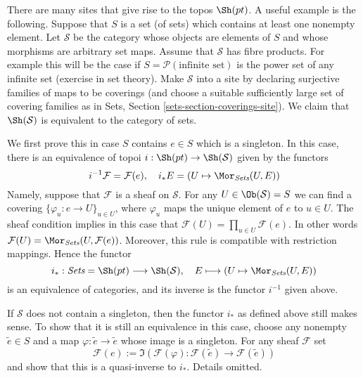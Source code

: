 \begin{remark}
\label{remark-pt-topos}
There are many sites that give rise to the topos $\Sh(pt)$.
A useful example is the following. Suppose that $S$ is a set (of sets)
which contains at least one nonempty element. Let $\mathcal{S}$ be the
category whose objects are elements of $S$ and whose morphisms are
arbitrary set maps. Assume that $\mathcal{S}$ has fibre products.
For example this will be the case if $S = \mathcal{P}(\text{infinite set})$
is the power set of any infinite set (exercise in set theory).
Make $\mathcal{S}$ into a site by declaring
surjective families of maps to be coverings (and choose
a suitable sufficiently large set of covering families as in
Sets, Section \ref{sets-section-coverings-site}).
We claim that $\Sh(\mathcal{S})$ is equivalent to the category of
sets.

\medskip\noindent
We first prove this in case $S$ contains $e \in S$ which is a singleton.
In this case, there is an equivalence of topoi
$i : \Sh(pt) \to \Sh(\mathcal{S})$ given by
the functors
\begin{equation}
\label{equation-sheaves-pt-sets}
i^{-1}\mathcal{F} = \mathcal{F}(e), \quad
i_*E = (U \mapsto \Mor_{\textit{Sets}}(U, E))
\end{equation}
Namely, suppose that $\mathcal{F}$ is a sheaf on $\mathcal{S}$.
For any $U \in \Ob(\mathcal{S}) = S$ we can find a covering
$\{\varphi_u : e \to U\}_{u \in U}$, where $\varphi_u$
maps the unique element of $e$ to $u \in U$. The sheaf condition
implies in this case that
$\mathcal{F}(U) = \prod_{u \in U} \mathcal{F}(e)$.
In other words
$\mathcal{F}(U) = \Mor_{\textit{Sets}}(U, \mathcal{F}(e))$.
Moreover, this rule is compatible with restriction mappings. Hence
the functor
$$
i_* :
\textit{Sets} = \Sh(pt)
\longrightarrow
\Sh(\mathcal{S}), \quad
E \longmapsto (U \mapsto \Mor_{\textit{Sets}}(U, E))
$$
is an equivalence of categories, and its inverse is the functor
$i^{-1}$ given above.

\medskip\noindent
If $\mathcal{S}$ does not contain a singleton, then the functor
$i_*$ as defined above still makes sense. To show that it is still
an equivalence in this case, choose any nonempty $\tilde e \in S$
and a map $\varphi : \tilde e \to \tilde e$ whose image is a singleton.
For any sheaf $\mathcal{F}$ set
$$
\mathcal{F}(e) :=
\Im(
\mathcal{F}(\varphi) :
\mathcal{F}(\tilde e)
\longrightarrow
\mathcal{F}(\tilde e)
)
$$
and show that this is a quasi-inverse to $i_*$. Details omitted.
\end{remark}

